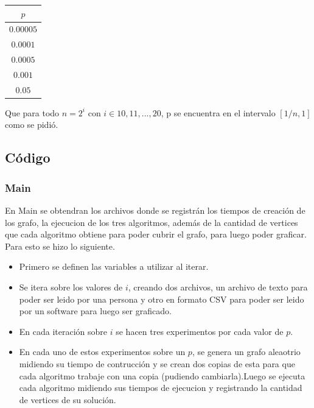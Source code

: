 \documentclass[letterpaper,10pt]{article}
\begin{document}
  \begin{center}
		\begin{tabular}{|c|}
			\hline
			$p$\\
			\hline
			$0.00005$ \\
			\hline
			$0.0001$\\
			\hline
			$0.0005$\\
			\hline
			$0.001$\\
			\hline
			$0.05$\\
			\hline
			
		\end{tabular}
	\end{center}
	
	
	Que para todo $n = 2^i$ con $i\in{10,11,...,20}$, p se encuentra en el intervalo $[1/n,1]$ como se pidió.

	\subsection{Código}
	
	\subsubsection{Main}
	
	En Main se obtendran los archivos donde se registrán los tiempos de creación de los grafo, la ejecucion de los tres algoritmos, además de la cantidad de vertices que cada algoritmo obtiene para poder cubrir el grafo, para luego poder graficar. Para esto se hizo lo siguiente.
	\begin{itemize}
		\item Primero se definen las variables a utilizar al iterar.
		\item Se itera sobre los valores de $i$, creando dos archivos, un archivo de texto para poder ser leido por una persona y otro en formato CSV para poder ser leido por un software para luego ser graficado. 
		\item En cada iteración sobre $i$ se hacen tres experimentos por cada valor de $p$.
		\item En cada uno de estos experimentos sobre un $p$, se genera un grafo aleaotrio midiendo su tiempo de contrucción y se crean dos copias de esta para que cada algoritmo trabaje con una copia (pudiendo cambiarla).Luego se ejecuta cada algoritmo midiendo sus tiempos de ejecucion y registrando la cantidad de vertices de su solución.
		
	\end{itemize}
	
\end{document}
